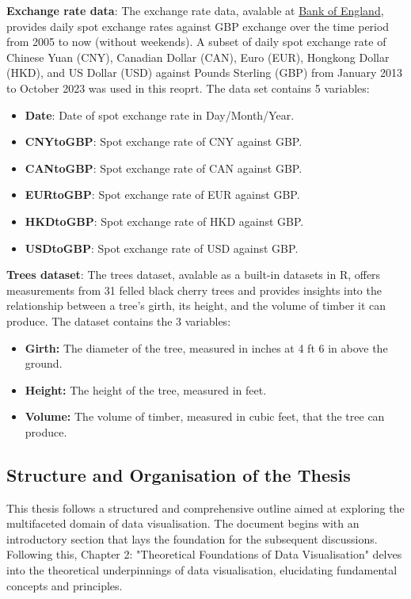 \documentclass{article}\usepackage[]{graphicx}\usepackage[]{xcolor}
\begin{document}
\noindent
\textbf{Exchange rate data}: The exchange rate data, avalable at \href{https://www.bankofengland.co.uk/boeapps/database/index.asp?first=yes&SectionRequired=I&HideNums=-1&ExtraInfo=true&Travel=NIx}{Bank of England}, provides daily spot exchange rates against GBP exchange over the time period from 2005 to now (without weekends). A subset of daily spot exchange rate of Chinese Yuan (CNY), Canadian Dollar (CAN), Euro (EUR), Hongkong Dollar (HKD), and US Dollar (USD) against Pounds Sterling (GBP) from January 2013 to October 2023 was used in this reoprt. The data set contains 5 variables:
\begin{itemize}
    \item \textbf{Date}: Date of spot exchange rate in Day/Month/Year.
    \item \textbf{CNYtoGBP}: Spot exchange rate of CNY against GBP.
    \item \textbf{CANtoGBP}: Spot exchange rate of CAN against GBP.
    \item \textbf{EURtoGBP}: Spot exchange rate of EUR against GBP.
    \item \textbf{HKDtoGBP}: Spot exchange rate of HKD against GBP.
    \item \textbf{USDtoGBP}: Spot exchange rate of USD against GBP.
\end{itemize}
\noindent
\textbf{Trees dataset}: The trees dataset, avalable as a built-in datasets in R, offers measurements from 31 felled black cherry trees and provides insights into the relationship between a tree's girth, its height, and the volume of timber it can produce. The dataset contains the 3 variables:
\begin{itemize}
    \item \textbf{Girth:} The diameter of the tree, measured in inches at 4 ft 6 in above the ground.
    \item \textbf{Height:} The height of the tree, measured in feet.
    \item \textbf{Volume:} The volume of timber, measured in cubic feet, that the tree can produce.
\end{itemize}

\subsection{Structure and Organisation of the Thesis}
This thesis follows a structured and comprehensive outline aimed at exploring the multifaceted domain of data visualisation. The document begins with an introductory section that lays the foundation for the subsequent discussions. Following this, Chapter 2: "Theoretical Foundations of Data Visualisation" delves into the theoretical underpinnings of data visualisation, elucidating fundamental concepts and principles.
\end{document}
